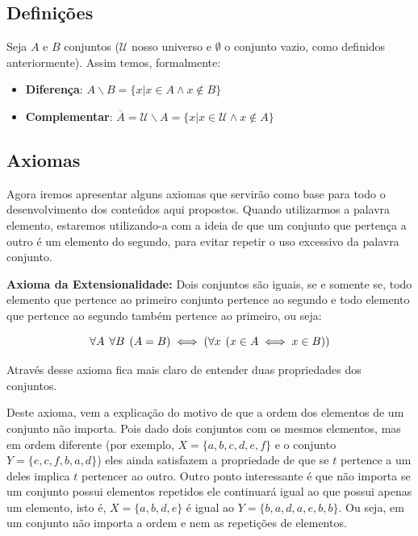   \subsection{Definições}
  Seja $A$ e $B$ conjuntos ($\mathcal{U}$ nosso universo e $\emptyset$ o conjunto vazio, como definidos anteriormente). Assim temos, formalmente:

  \begin{itemize}
    \item \textbf{Diferença}: $A \backslash B = \{x | x \in A \land x \notin B\}$
  
    \item \textbf{Complementar}: $\overline A = \mathcal{U} \backslash A = \{x | x \in \mathcal{U} \land x \notin A\}$
  \end{itemize} 

  \subsection{Axiomas}
  Agora iremos apresentar alguns axiomas que servirão como base para todo o desenvolvimento dos conteúdos aqui propostos. Quando utilizarmos a palavra elemento, estaremos utilizando-a com a ideia de que um conjunto que pertença a outro é um elemento do segundo, para evitar repetir o uso excessivo da palavra conjunto.
  
  \textbf{Axioma da Extensionalidade:} Dois conjuntos são iguais, se e somente se, todo elemento que pertence ao primeiro conjunto pertence ao segundo e todo elemento que pertence ao segundo também pertence ao primeiro, ou seja:
  
  \[\forall A \hspace{1.5mm} \forall B \hspace{1.5mm} (A = B) \iff (\forall x \hspace{1.5mm} (x \in A \iff x \in B))\] 
  
  Através desse axioma fica mais claro de entender duas propriedades dos conjuntos. 
  
  Deste axioma, vem a explicação do motivo de que a ordem dos elementos de um conjunto não importa. Pois dado dois conjuntos com os mesmos elementos, mas em ordem diferente (por exemplo, $X=\{a,b,c,d,e,f\}$ e o conjunto $Y=\{e,c,f,b,a,d\}$) eles ainda satisfazem a propriedade de que se $t$ pertence a um deles implica $t$ pertencer ao outro. Outro ponto interessante é que não importa se um conjunto possui elementos repetidos ele continuará igual ao que possui apenas um elemento, isto é, $X=\{a,b,d,e\}$ é igual ao $Y=\{b,a,d,a,e,b,b\}$. Ou seja, em um conjunto não importa a ordem e nem as repetições de elementos.
  
